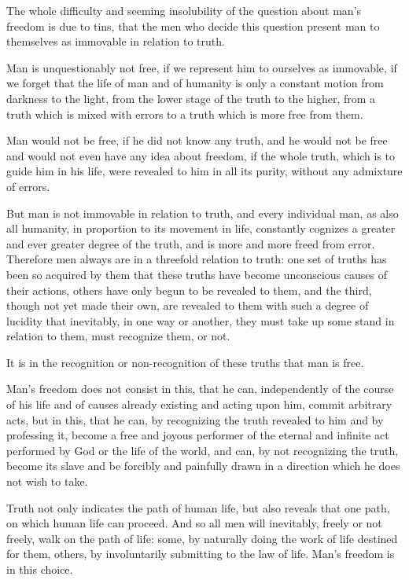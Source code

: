 \documentclass{book}
\begin{document}
The whole difficulty and seeming insolubility of the question about man’s freedom is due to tins, that the men who decide this question present man to themselves as immovable in relation to truth.

Man is unquestionably not free, if we represent him to ourselves as immovable, if we forget that the life of man and of humanity is only a constant motion from darkness to the light, from the lower stage of the truth to the higher, from a truth which is mixed with errors to a truth which is more free from them.

Man would not be free, if he did not know any truth, and he would not be free and would not even have any idea about freedom, if the whole truth, which is to guide him in his life, were revealed to him in all its purity, without any admixture of errors.

But man is not immovable in relation to truth, and every individual man, as also all humanity, in proportion to its movement in life, constantly cognizes a greater and ever greater degree of the truth, and is more and more freed from error. Therefore men always are in a threefold relation to truth: one set of truths has been so acquired by them that these truths have become unconscious causes of their actions, others have only begun to be revealed to them, and the third, though not yet made their own, are revealed to them with such a degree of lucidity that inevitably, in one way or another, they must take up some stand in relation to them, must recognize them, or not.

It is in the recognition or non-recognition of these truths that man is free.

Man’s freedom does not consist in this, that he can, independently of the course of his life and of causes already existing and acting upon him, commit arbitrary acts, but in this, that he can, by recognizing the truth revealed to him and by professing it, become a free and joyous performer of the eternal and infinite act performed by God or the life of the world, and can, by not recognizing the truth, become its slave and be forcibly and painfully drawn in a direction which he does not wish to take.

Truth not only indicates the path of human life, but also reveals that one path, on which human life can proceed. And so all men will inevitably, freely or not freely, walk on the path of life: some, by naturally doing the work of life destined for them, others, by involuntarily submitting to the law of life. Man’s freedom is in this choice.
\end{document}
